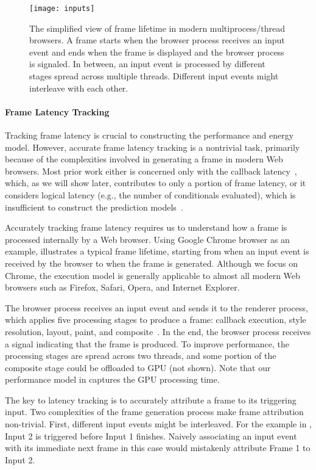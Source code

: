 \begin{figure}[t]
  \centering
  \texttt{[image: inputs]}
  \caption{The simplified view of frame lifetime in modern multiprocess/thread browsers. A frame starts when the browser process receives an input event and ends when the frame is displayed and the browser process is signaled. In between, an input event is processed by different stages spread across multiple threads. Different input events might interleave with each other.}
  \label{fig:inputs}
\end{figure}

\paragraph{Frame Latency Tracking} Tracking frame latency is crucial to constructing the performance and energy model. However, accurate frame latency tracking is a nontrivial task, primarily because of the complexities involved in generating a frame in modern Web browsers. Most prior work either is concerned only with the callback latency~\cite{ebs,efetch}, which, as we will show later, contributes to only a portion of frame latency, or it considers logical latency (e.g., the number of conditionals evaluated), which is insufficient to construct the prediction models~\cite{eventbreak}.

Accurately tracking frame latency requires us to understand how a frame is processed internally by a Web browser. Using Google Chrome browser as an example,  illustrates a typical frame lifetime, starting from when an input event is received by the browser to when the frame is generated. Although we focus on Chrome, the execution model is generally applicable to almost all modern Web browsers such as Firefox, Safari, Opera, and Internet Explorer.

The browser process receives an input event and sends it to the renderer process, which applies five processing stages to produce a frame: callback execution, style resolution, layout, paint, and composite~\cite{renderingpipeline}. In the end, the browser process receives a signal indicating that the frame is produced. To improve performance, the processing stages are spread across two threads, and some portion of the composite stage could be offloaded to GPU (not shown). Note that our performance model in  captures the GPU processing time.

The key to latency tracking is to accurately attribute a frame to its triggering input. Two complexities of the frame generation process make frame attribution non-trivial. First, different input events might be interleaved. For the example in , Input 2 is triggered before Input 1 finishes. Naively associating an input event with its immediate next frame in this case would mistakenly attribute Frame 1 to Input 2.


